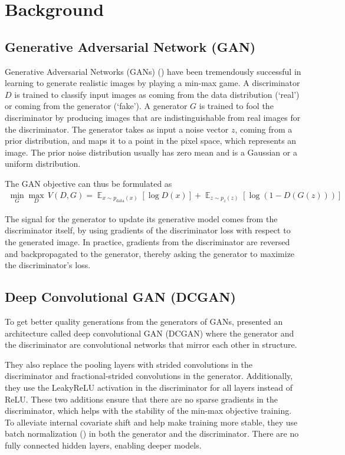 \documentclass{article}
\DeclareMathOperator*{\E}{\mathbb{E}}
\begin{document}
\section{Background}

\subsection{Generative Adversarial Network (GAN)}

Generative Adversarial Networks (GANs) (\cite{gan}) have been tremendously successful in learning to generate realistic images by playing a min-max game. A discriminator $D$ is trained to classify input images as coming from the data distribution (`real') or coming from the generator (`fake'). A generator $G$ is trained to fool the discriminator by producing images that are indistinguishable from real images for the discriminator. The generator takes as input a noise vector $z$, coming from a prior distribution, and maps it to a point in the pixel space, which represents an image. The prior noise distribution usually has zero mean and is a Gaussian or a uniform distribution.

The GAN objective can thus be formulated as
\begin{align}
\min_G \max_D\, V(D,G) = \E_{x \sim p_{\text{data}}(x)}\left[\log D(x)\right] + \E_{z\sim p_z(z)}\left[\log(1-D(G(z)))\right] \label{eq:gan}
\end{align}

The signal for the generator to update its generative model comes from the discriminator itself, by using gradients of the discriminator loss with respect to the generated image. In practice, gradients from the discriminator are reversed and backpropagated to the generator, thereby asking the generator to maximize the discriminator's loss.


\subsection{Deep Convolutional GAN (DCGAN)}

To get better quality generations from the generators of GANs, \cite{dcgan} presented an architecture called deep convolutional GAN (DCGAN) where the generator and the discriminator are convolutional networks that mirror each other in structure.

They also replace the pooling layers with strided convolutions in the discriminator and fractional-strided convolutions in the generator. Additionally, they use the LeakyReLU activation in the discriminator for all layers instead of ReLU. These two additions ensure that there are no sparse gradients in the discriminator, which helps with the stability of the min-max objective training. To alleviate internal covariate shift and help make training more stable, they use batch normalization (\cite{batchnorm}) in both the generator and the discriminator. There are no fully connected hidden layers, enabling deeper models.
\end{document}
